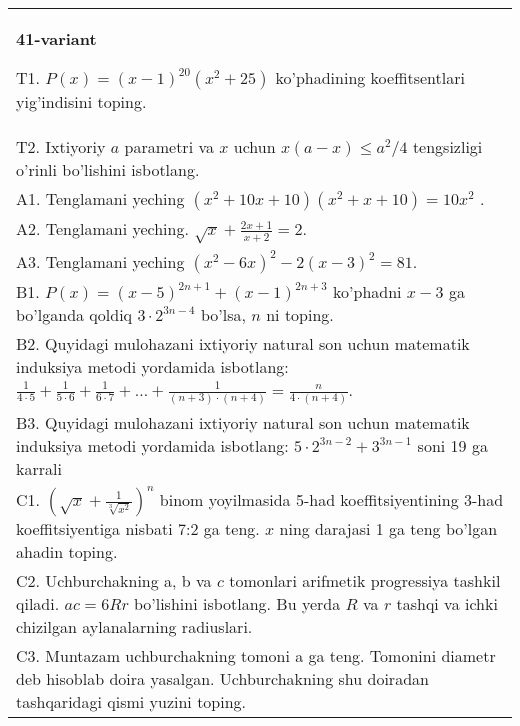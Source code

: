 \documentclass{article}
\begin{document}
\begin{tabular}{m{17cm}}
\textbf{41-variant}
\newline

T1. \(P(x) = (x - 1)^{20}\left( x^{2} + 25 \right)\) ko'phadining koeffitsentlari yig'indisini toping. \\
T2. Ixtiyoriy \(a\) parametri va \(x\) uchun \(x(a - x) \leq a^{2}/4\) tengsizligi o'rinli bo'lishini isbotlang. \\
A1. Tenglamani yeching \(\left( x^{2} + 10x + 10 \right)\left( x^{2} + x + 10 \right) = 10x^{2}\) . \\
A2. Tenglamani yeching. \(\sqrt{x} + \frac{2x + 1}{x + 2} = 2\). \\
A3. Tenglamani yeching \(\left( x^{2} - 6x \right)^{2} - 2(x - 3)^{2} = 81\). \\
B1. \(P(x) = (x - 5)^{2n + 1} + (x - 1)^{2n + 3}\) ko'phadni \(x - 3\) ga bo'lganda qoldiq \(3 \cdot 2^{3n - 4}\) bo'lsa, \(n\) ni toping. \\
B2. Quyidagi mulohazani ixtiyoriy natural son uchun matematik induksiya metodi yordamida isbotlang: \(\frac{1}{4 \cdot 5} + \frac{1}{5 \cdot 6} + \frac{1}{6 \cdot 7} + \ldots + \frac{1}{(n + 3) \cdot (n + 4)} = \frac{n}{4 \cdot (n + 4)}\). \\
B3. Quyidagi mulohazani ixtiyoriy natural son uchun matematik induksiya metodi yordamida isbotlang: \(5 \cdot 2^{3n - 2} + 3^{3n - 1}\) soni 19 ga karrali \\
C1. \(\left( \sqrt{x} + \frac{1}{\sqrt[3]{x^{2}}} \right)^{n}\) binom yoyilmasida 5-had koeffitsiyentining 3-had koeffitsiyentiga nisbati 7:2 ga teng. \(x\) ning darajasi 1 ga teng bo'lgan ahadin toping. \\
C2. Uchburchakning a, b va \(c\) tomonlari arifmetik progressiya tashkil qiladi. \(ac = 6Rr\) bo'lishini isbotlang. Bu yerda \(R\) va \(r\) tashqi va ichki chizilgan aylanalarning radiuslari. \\
C3. Muntazam uchburchakning tomoni a ga teng. Tomonini diametr deb hisoblab doira yasalgan. Uchburchakning shu doiradan tashqaridagi qismi yuzini toping. \\

\end{tabular}
\vspace{1cm}
\end{document}
